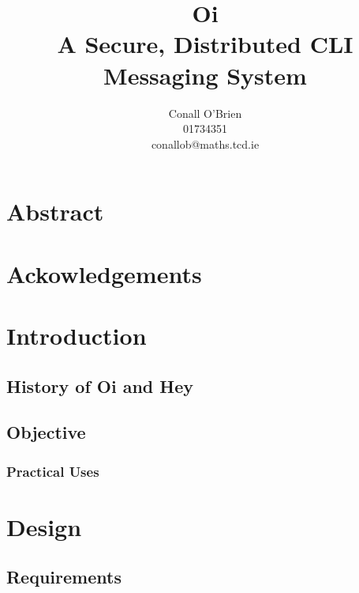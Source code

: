 \documentclass[a4paper,12pt]{article}
\begin{document}
\title{Oi \\ A Secure, Distributed CLI Messaging System}

\author{Conall O'Brien \\ 01734351 \\ conallob@maths.tcd.ie}

\maketitle

\pagebreak

\chapter{Abstract}

\pagebreak

\chapter{Ackowledgements}

\pagebreak


\tableofcontents

\pagebreak


\chapter{Introduction}


\section{History of Oi and Hey} 

\section{Objective}

\subsection{Practical Uses}

\pagebreak


\chapter{Design}

\section{Requirements}
\end{document}
